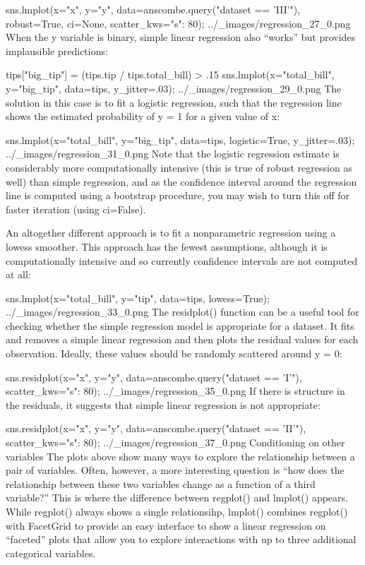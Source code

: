 sns.lmplot(x="x", y="y", data=anscombe.query("dataset == 'III'"),
           robust=True, ci=None, scatter_kws={"s": 80});
../_images/regression_27_0.png
When the y variable is binary, simple linear regression also “works” but provides implausible predictions:

tips["big_tip"] = (tips.tip / tips.total_bill) > .15
sns.lmplot(x="total_bill", y="big_tip", data=tips,
           y_jitter=.03);
../_images/regression_29_0.png
The solution in this case is to fit a logistic regression, such that the regression line shows the estimated probability of y = 1 for a given value of x:

sns.lmplot(x="total_bill", y="big_tip", data=tips,
           logistic=True, y_jitter=.03);
../_images/regression_31_0.png
Note that the logistic regression estimate is considerably more computationally intensive (this is true of robust regression as well) than simple regression, and as the confidence interval around the regression line is computed using a bootstrap procedure, you may wish to turn this off for faster iteration (using ci=False).

An altogether different approach is to fit a nonparametric regression using a lowess smoother. This approach has the fewest assumptions, although it is computationally intensive and so currently confidence intervals are not computed at all:

sns.lmplot(x="total_bill", y="tip", data=tips,
           lowess=True);
../_images/regression_33_0.png
The residplot() function can be a useful tool for checking whether the simple regression model is appropriate for a dataset. It fits and removes a simple linear regression and then plots the residual values for each observation. Ideally, these values should be randomly scattered around y = 0:

sns.residplot(x="x", y="y", data=anscombe.query("dataset == 'I'"),
              scatter_kws={"s": 80});
../_images/regression_35_0.png
If there is structure in the residuals, it suggests that simple linear regression is not appropriate:

sns.residplot(x="x", y="y", data=anscombe.query("dataset == 'II'"),
              scatter_kws={"s": 80});
../_images/regression_37_0.png
Conditioning on other variables
The plots above show many ways to explore the relationship between a pair of variables. Often, however, a more interesting question is “how does the relationship between these two variables change as a function of a third variable?” This is where the difference between regplot() and lmplot() appears. While regplot() always shows a single relationsihp, lmplot() combines regplot() with FacetGrid to provide an easy interface to show a linear regression on “faceted” plots that allow you to explore interactions with up to three additional categorical variables.

